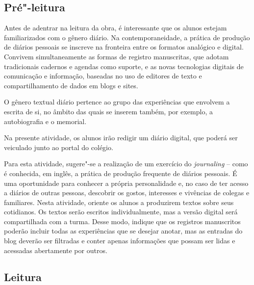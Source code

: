 \documentclass[12pt]{extarticle}
\begin{document}
\subsection{Pré"-leitura}


Antes de adentrar na leitura da obra, é interessante que os
alunos estejam familiarizados com o gênero diário. Na contemporaneidade,
a prática de produção de diários pessoais se inscreve na fronteira entre
os formatos analógico e digital. Convivem simultaneamente as formas de
registro manuscritas, que adotam tradicionais cadernos e agendas como
suporte, e as novas tecnologias digitais de comunicação e informação,
baseadas no uso de editores de texto e compartilhamento de dados em
blogs e sites.

O gênero textual diário pertence ao grupo das experiências que envolvem
a escrita de si, no âmbito das quais se inserem também, por exemplo, a
autobiografia e o memorial.

Na presente atividade, os alunos irão redigir um diário digital, que
poderá ser veiculado junto ao portal do colégio.

Para esta atividade, sugere"-se a realização de um exercício do
\emph{journaling} -- como é conhecida, em inglês, a prática de produção
frequente de diários pessoais. É uma oportunidade para conhecer a
própria personalidade e, no caso de ter acesso a diários de outras
pessoas, descobrir os gostos, interesses e vivências de colegas e
familiares. Nesta atividade, oriente os alunos a produzirem textos sobre
seus cotidianos. Os textos serão escritos individualmente, mas a versão
digital será compartilhada com a turma. Desse modo, indique que os
registros manuscritos poderão incluir todas as experiências que se
desejar anotar, mas as entradas do blog deverão ser filtradas e conter
apenas informações que possam ser lidas e acessadas abertamente por
outros.

\subsection{Leitura}

\end{document}
